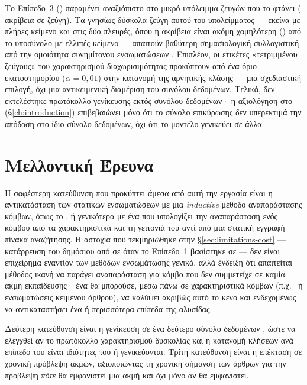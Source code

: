 Το Επίπεδο~3 (\texttt{}) παραμένει αναξιόπιστο στο μικρό
υπόλειμμα ζευγών που το φτάνει (\TierThreeAcc{} ακρίβεια σε \TierThreeCount{} ζεύγη).
Τα γνησίως δύσκολα
ζεύγη αυτού του υπολείμματος --- εκείνα με πλήρες κείμενο και στις δύο πλευρές,
όπου η ακρίβεια είναι ακόμη χαμηλότερη (\HardResCompleteAcc{}) από το υποσύνολο με ελλιπές
κείμενο --- απαιτούν βαθύτερη σημασιολογική συλλογιστική από την ομοιότητα
συνημίτονου ενσωματώσεων .
Επιπλέον, οι ετικέτες
«τετριμμένου ζεύγους» του χαρακτηρισμού διαχωρισιμότητας προκύπτουν από ένα όριο
εκατοστημορίου ($\alpha = 0{,}01$) στην κατανομή της αρνητικής κλάσης --- μια
σχεδιαστική επιλογή, όχι μια αντικειμενική διαμέριση του συνόλου δεδομένων.
Τελικά,
δεν εκτελέστηκε πρωτόκολλο γενίκευσης εκτός συνόλου δεδομένων· η αξιολόγηση στο
 (\S\ref{ch:introduction}) επιβεβαιώνει μόνο ότι το σύνολο επικύρωσης δεν
υπερεκτιμά την απόδοση στο ίδιο σύνολο δεδομένων, όχι ότι το μοντέλο γενικεύει σε
άλλα.


\section{Μελλοντική Έρευνα}
\label{sec:future-work}

Η σαφέστερη κατεύθυνση που προκύπτει άμεσα από αυτή την εργασία είναι η
αντικατάσταση των στατικών ενσωματώσεων  με μια \textit{inductive}
μέθοδο αναπαράστασης κόμβων, όπως το , ή γενικότερα με ένα
 που υπολογίζει την αναπαράσταση ενός κόμβου από τα
χαρακτηριστικά και τη γειτονιά του αντί από μια στατική εγγραφή πίνακα αναζήτησης.
Η αστοχία που τεκμηριώθηκε στην \S\ref{sec:limitations-cost} --- κατάρρευση του
δημόσιου  από \KaggleBaselinePublic{} σε \NTwoVKagglePublic{} όταν το Επίπεδο~1 βασίστηκε σε
 --- δεν είναι επιχείρημα εναντίον των μεθόδων ενσωμάτωσης γενικά, αλλά
ένδειξη ότι απαιτείται μέθοδος ικανή να παράγει αναπαράσταση για κόμβο που δεν
συμμετείχε σε καμία ακμή εκπαίδευσης· ένα  θα μπορούσε, μέσω
 πάνω σε χαρακτηριστικά κόμβων (π.χ.\  ή
 ενσωματώσεις κειμένου άρθρου), να καλύψει ακριβώς αυτό το
κενό και ενδεχομένως να αντικαταστήσει ένα ή περισσότερα επίπεδα της αλυσίδας.

Δεύτερη κατεύθυνση είναι η γενίκευση σε ένα δεύτερο σύνολο δεδομένων , ώστε
να ελεγχθεί αν το πρωτόκολλο χαρακτηρισμού δυσκολίας και η κατανομή κλήσεων ανά
επίπεδο του  είναι ιδιότητες του  ή γενικεύονται.
Τρίτη
κατεύθυνση είναι η επέκταση σε χρονική πρόβλεψη ακμών, αξιοποιώντας τη χρονική
σήμανση των άρθρων  για την πρόβλεψη \textit{πότε} θα εμφανιστεί μια
ακμή και όχι μόνο αν θα εμφανιστεί.

